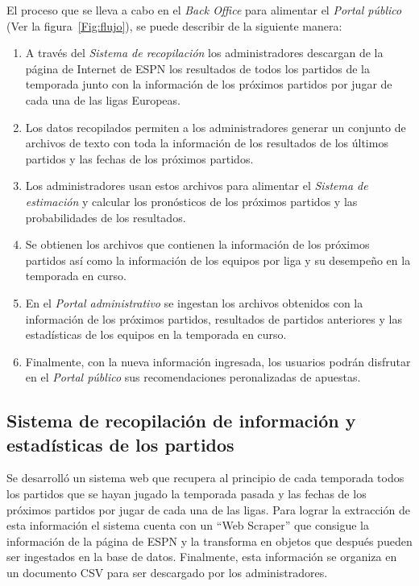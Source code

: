 El proceso que se lleva a cabo en el \emph{Back Office} para alimentar el \emph{Portal público} (Ver la figura~\ref{Fig:flujo}), se puede describir de la siguiente manera:
\begin{enumerate}
	\item A través del \emph{Sistema de recopilación} los administradores descargan de la página de Internet de ESPN los resultados de todos los partidos de la temporada junto con la información de los próximos partidos por jugar  de cada una de las ligas Europeas.
	\item Los datos recopilados permiten a los administradores generar un conjunto de archivos de texto con toda la información de los resultados de los últimos partidos y las fechas de los próximos partidos.
	\item Los administradores usan estos archivos para alimentar el \emph{Sistema de estimación} y calcular los pronósticos de los próximos partidos y las probabilidades de los resultados.
	\item Se obtienen los archivos que contienen la información de los próximos partidos así como la información de los equipos por liga y su desempeño en la temporada en curso.
	\item En el \emph{Portal administrativo} se ingestan los archivos obtenidos con la información de los próximos partidos, resultados de partidos anteriores y las estadísticas de los equipos en la temporada en curso.
	\item Finalmente, con la nueva información ingresada, los usuarios podrán disfrutar en el \emph{Portal público} sus recomendaciones peronalizadas de apuestas.
\end{enumerate}


\subsection{Sistema de recopilación de información y estadísticas de los partidos}
\graphicspath{{/Users/brunomedina/Dropbox/Tesis-Egobets/egobets-notas/resources/recopilador/}}
Se desarrolló un sistema web que recupera al principio de cada temporada todos los partidos que se hayan jugado la temporada pasada y las fechas de los próximos partidos por jugar de cada una de las ligas. Para lograr la extracción de esta información el sistema cuenta con un ``Web Scraper'' que consigue la información de la página de ESPN y la transforma en objetos que después pueden ser ingestados en la base de datos. Finalmente, esta información se organiza en un documento CSV para ser descargado por los administradores.

